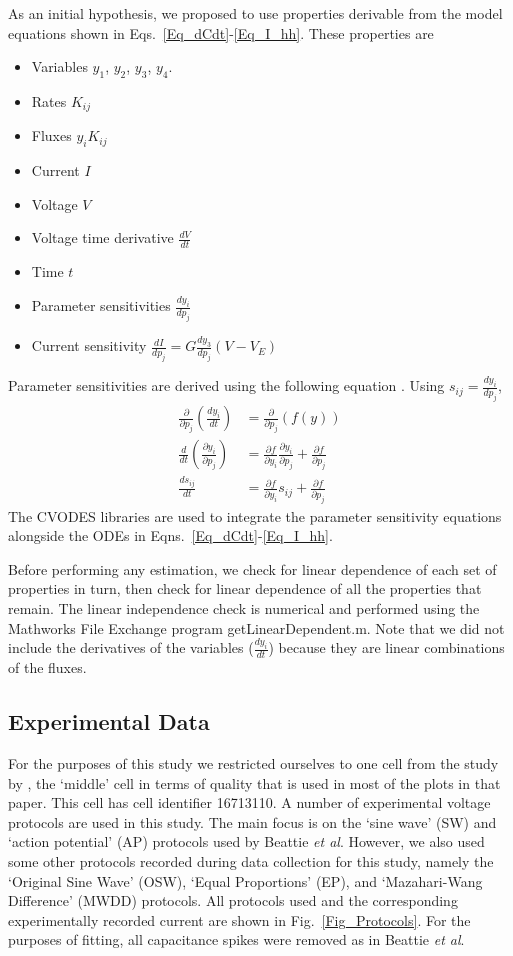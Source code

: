 \documentclass[11pt,a4paper,oneside]{article}
\begin{document}
As an initial hypothesis, we proposed to use properties derivable from the model equations shown in Eqs.~\eqref{Eq_dCdt}-\eqref{Eq_I_hh}. These properties are
\begin{itemize}
\item Variables $y_1$, $y_2$, $y_3$, $y_4$.
\item Rates $K_{ij}$
\item Fluxes $y_i K_{ij}$
\item Current $I$
\item Voltage $V$
\item Voltage time derivative $\frac{dV}{dt}$
\item Time $t$
\item Parameter sensitivities $\frac{dy_i}{dp_j}$
\item Current sensitivity $\frac{dI}{dp_j} = G \frac{dy_3}{dp_j} (V-V_E) $
\end{itemize}

Parameter sensitivities are derived using the following equation \cite{}. Using $s_{ij} = \frac{dy_i}{dp_j}$,
\begin{align}
	\frac{\partial}{\partial p_j} ( \frac{dy_i}{dt} ) & = \frac{\partial}{\partial p_j} (f( y ) ) \\
	\frac{d}{dt}(\frac{\partial y_i}{\partial p_j})   & = \frac{\partial f}{ \partial y_i}\frac{\partial y_i}{ \partial p_j} + \frac{\partial f}{ \partial p_j} \\
	\frac{d s_{ij}}{dt} & = \frac{\partial f}{ \partial y_i} s_{ij} + \frac{\partial f}{ \partial p_j}
\end{align}
The CVODES libraries are used to integrate the parameter sensitivity equations alongside the ODEs in Eqns.~\eqref{Eq_dCdt}-\eqref{Eq_I_hh}.

Before performing any estimation, we check for linear dependence of each set of properties in turn, then check for linear dependence of all the properties that remain. The linear independence check is numerical and performed using the Mathworks File Exchange program getLinearDependent.m. Note that we did not include the derivatives of the variables ($\frac{dy_i}{dt}$) because they are linear combinations of the fluxes.

\subsection{Experimental Data}
For the purposes of this study we restricted ourselves to one cell from the study by \cite{}, the `middle' cell in terms of quality that is used in most of the plots in that paper. This cell has cell identifier 16713110. A number of experimental voltage protocols are used in this study. The main focus is on the `sine wave' (SW) and `action potential' (AP) protocols used by Beattie \textit{et al}\cite{Beattie2018}. However, we also used some other protocols recorded during data collection for this study, namely the `Original Sine Wave' (OSW), `Equal Proportions' (EP), and `Mazahari-Wang Difference' (MWDD) protocols. All protocols used and the corresponding experimentally recorded current are shown in Fig.~\ref{Fig_Protocols}. For the purposes of fitting, all capacitance spikes were removed as in Beattie \textit{et al}\cite{Beattie2018}.
\end{document}
